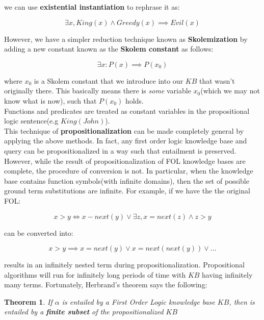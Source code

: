 \documentclass[12pt]{article}
\newtheorem{theorem}{Theorem}
\begin{document}
we can use \textbf{existential instantiation} to rephrase it as:

\begin{equation*}
\exists x, King(x) \land Greedy(x) \implies Evil(x)
\end{equation*}
 
However, we have a simpler reduction technique known as \textbf{Skolemization} by adding a new constant known as the \textbf{Skolem constant} as follows:

\begin{equation*}
\exists x: P(x) \implies P(x_0)
\end{equation*}

where $x_0$ is a Skolem constant that we introduce into our $KB$ that wasn't originally there. This basically means there is \textit{some} variable $x_0$(which we may not know what is now), such that $P(x_0)$ holds.\\

Functions and predicates are treated as constant variables in the propositional logic sentence(e.g $King(John)$).\\

This technique of \textbf{propositionalization} can be made completely general by applying the above methods. In fact, any first order logic knowledge base and query can be propositionalized in a way such that entailment is preserved. However, while the result of propositionalization of FOL knowledge bases are complete, the procedure of conversion is not. In particular, when the knowledge base contains function symbols(with infinite domains), then the set of possible ground term substitutions are infinite. For example, if we have the the original FOL:

\begin{equation*}
x > y \iff x - next(y) \lor \exists z, x = next(z) \land z > y
\end{equation*}

can be converted into:

\begin{equation*}
x > y \implies x = next(y) \lor x = next(next(y)) \lor ...
\end{equation*}

results in an infinitely nested term during propositionalization. Propositional algorithms will run for infinitely long periods of time with $KB$ having infinitely many terms. Fortunately, Herbrand's theorem says the following:

\begin{theorem}
If $\alpha$ is entailed by a First Order Logic knowledge base $KB$, then is entailed by a \textbf{finite subset} of the propositionalized $KB$
\end{theorem}
\end{document}
